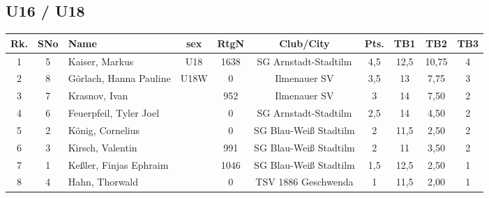 \documentclass[a4paper,ngerman]{tui-algo-seminar}
\begin{document}
\subsection{U16 / U18}
	\begin{center}
	\begin{tabular}{|c|c|l|c|c|c|c|c|c|c|}
		\hline
		\textbf{Rk.} & \textbf{SNo} & \textbf{Name} & \textbf{sex} & \textbf{RtgN} & \textbf{Club/City} & \textbf{Pts.} & \textbf{TB1} & \textbf{TB2} & \textbf{TB3} \\
		\hline
		1 & 5 & Kaiser, Markus & U18 & 1638 & SG Arnstadt-Stadtilm & 4,5 & 12,5 & 10,75 & 4 \\
		2 & 8 & Görlach, Hanna Pauline & U18W & 0 & Ilmenauer SV & 3,5 & 13 & 7,75 & 3 \\
		3 & 7 & Krasnov, Ivan & & 952 & Ilmenauer SV & 3 & 14 & 7,50 & 2 \\
		4 & 6 & Feuerpfeil, Tyler Joel & & 0 & SG Arnstadt-Stadtilm & 2,5 & 14 & 4,50 & 2 \\
		5 & 2 & König, Cornelius & & 0 & SG Blau-Weiß Stadtilm & 2 & 11,5 & 2,50 & 2 \\
		6 & 3 & Kirsch, Valentin & & 991 & SG Blau-Weiß Stadtilm & 2 & 11 & 3,50 & 2 \\
		7 & 1 & Keßler, Finjas Ephraim & & 1046 & SG Blau-Weiß Stadtilm & 1,5 & 12,5 & 2,50 & 1 \\
		8 & 4 & Hahn, Thorwald & & 0 & TSV 1886 Geschwenda & 1 & 11,5 & 2,00 & 1 \\
		\hline
	\end{tabular}
\end{center}
\end{document}
